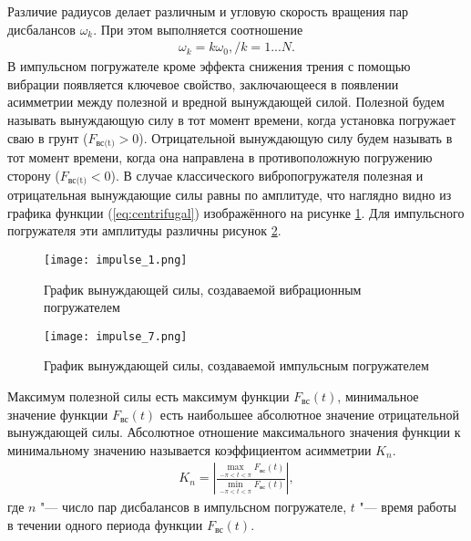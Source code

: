 Различие радиусов делает различным и угловую скорость вращения пар дисбалансов $\omega_k$. При этом выполняется соотношение
\begin{equation}\label{eq:angle_speed}
    \begin{gathered}
        \omega_k = k \omega_0, / k=1...N.
    \end{gathered}
\end{equation}
В импульсном погружателе кроме эффекта снижения трения с помощью вибрации появляется ключевое свойство, заключающееся в появлении асимметрии между полезной и вредной вынуждающей силой.
Полезной будем называть вынуждающую силу в тот момент времени, когда установка погружает сваю в грунт ($F_{\textrm{вс(t)}}>0$).
Отрицательной вынуждающую силу будем называть в тот момент времени, когда она направлена в противоположную погружению сторону ($F_{\textrm{вс(t)}}<0$).
В случае классического вибропогружателя полезная и отрицательная вынуждающие силы равны по амплитуде, что наглядно видно из графика функции (\ref{eq:centrifugal}) изображённого на рисунке \ref{fig:vibr_grap}.
Для импульсного погружателя эти амплитуды различны рисунок \ref{fig:impulse_grap}.
\begin{figure}[h]
    \centering
    \texttt{[image: impulse\_1.png]}
    \caption{График вынуждающей силы, создаваемой вибрационным погружателем}
    \label{fig:vibr_grap}
\end{figure}
\begin{figure}[h]
    \centering
    \texttt{[image: impulse\_7.png]}
    \caption{График вынуждающей силы, создаваемой импульсным погружателем}
    \label{fig:impulse_grap}
\end{figure}
Максимум полезной силы есть максимум функции $F_{\textrm{вс}}(t)$, минимальное значение функции $F_{\textrm{вс}}(t)$ есть наибольшее абсолютное значение отрицательной вынуждающей силы.
Абсолютное отношение максимального значения функции к минимальному значению называется коэффициентом асимметрии $K_n$.
\begin{equation}\label{eq:min_max}
    \begin{gathered}
        K_n = \left|\frac{\max \limits_{-\pi<t<\pi} F_{\textrm{вс}}(t)}{\min \limits_{-\pi<t<\pi} F_{\textrm{вс}}(t)}\right|,
    \end{gathered}
\end{equation}
\noindent где $n$ "--- число пар дисбалансов в импульсном погружателе, $t$ "--- время работы в течении одного периода функции $F_{\textrm{вс}}(t)$.

